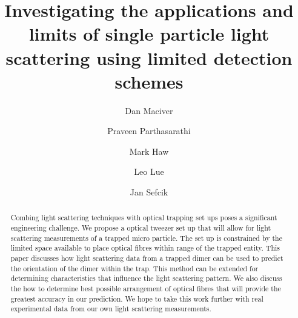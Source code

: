 \documentclass[final,3p, twocolumn]{elsarticle}
\begin{document}
\begin{frontmatter}



\title{Investigating the applications and limits of single particle light scattering using limited detection schemes}


\author[aff1]{Dan Maciver} %

\author[aff1]{Praveen Parthasarathi}

\author[aff1]{Mark Haw}

\author[aff1]{Leo Lue}

\author[aff1]{Jan Sefcik}



\begin{abstract}
Combing light scattering techniques with optical trapping set ups poses a significant engineering challenge. We propose a optical tweezer set up that will allow for light scattering measurements of a trapped micro particle. The set up is constrained by the limited space available to place optical fibres within range of the trapped entity. This paper discusses how light scattering data from a trapped dimer can be used to predict the orientation of the dimer within the trap. This method can be extended for determining characteristics that influence the light scattering pattern. We also discuss the how to determine best possible arrangement of optical fibres that will provide the greatest accuracy in our prediction. We hope to take this work further with real experimental data from our own light scattering measurements. 


\end{abstract}
\end{frontmatter}
\end{document}
